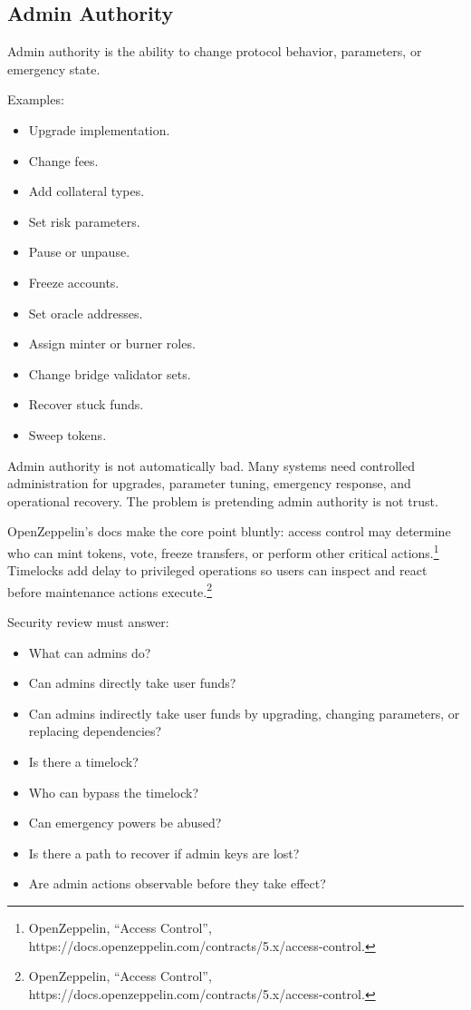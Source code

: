 \subsection{Admin Authority}

Admin authority is the ability to change protocol behavior, parameters,
or emergency state.

Examples:

\begin{itemize}
\tightlist
\item
  Upgrade implementation.
\item
  Change fees.
\item
  Add collateral types.
\item
  Set risk parameters.
\item
  Pause or unpause.
\item
  Freeze accounts.
\item
  Set oracle addresses.
\item
  Assign minter or burner roles.
\item
  Change bridge validator sets.
\item
  Recover stuck funds.
\item
  Sweep tokens.
\end{itemize}

Admin authority is not automatically bad. Many systems need controlled
administration for upgrades, parameter tuning, emergency response, and
operational recovery. The problem is pretending admin authority is not
trust.

OpenZeppelin's docs make the core point bluntly: access control may
determine who can mint tokens, vote, freeze transfers, or perform other
critical actions.\footnote{OpenZeppelin, ``Access Control'',
  https://docs.openzeppelin.com/contracts/5.x/access-control.} Timelocks
add delay to privileged operations so users can inspect and react before
maintenance actions execute.\footnote{OpenZeppelin, ``Access Control'',
  https://docs.openzeppelin.com/contracts/5.x/access-control.}

Security review must answer:

\begin{itemize}
\tightlist
\item
  What can admins do?
\item
  Can admins directly take user funds?
\item
  Can admins indirectly take user funds by upgrading, changing
  parameters, or replacing dependencies?
\item
  Is there a timelock?
\item
  Who can bypass the timelock?
\item
  Can emergency powers be abused?
\item
  Is there a path to recover if admin keys are lost?
\item
  Are admin actions observable before they take effect?
\end{itemize}

